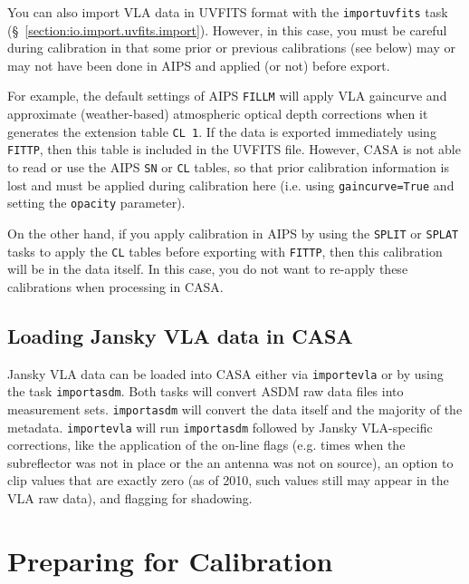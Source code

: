 You can also import VLA data in UVFITS format with the 
{\tt importuvfits} task (\S~\ref{section:io.import.uvfits.import}).
However, in this case, you must be careful during calibration in
that some prior or previous calibrations (see below) may or may not
have been done in AIPS and applied (or not) before export.

For example, the default settings of AIPS {\tt FILLM} will apply
VLA gaincurve and approximate (weather-based) atmospheric optical
depth corrections when it generates the extension table {\tt CL 1}.
If the data is exported immediately using {\tt FITTP}, then this 
table is included in the UVFITS file.  However, CASA is not able
to read or use the AIPS {\tt SN} or {\tt CL} tables, so that 
prior calibration information is lost and must be applied during
calibration here (i.e. using {\tt gaincurve=True} and setting the
{\tt opacity} parameter).  

On the other hand, if you apply calibration in AIPS by using the
{\tt SPLIT} or {\tt SPLAT} tasks to apply the {\tt CL} tables before
exporting with {\tt FITTP}, then this calibration will be in the
data itself.  In this case, you do not want to re-apply these
calibrations when processing in CASA.

\subsection{Loading Jansky VLA data in CASA}
\label{section:cal.flow.evla}

Jansky VLA data can be loaded into CASA either via {\tt importevla} or by
using the task {\tt importasdm}. Both tasks will convert ASDM raw data
files into measurement sets. {\tt importasdm} will convert the data
itself and the majority of the metadata. {\tt importevla} will run
{\tt importasdm} followed by Jansky VLA-specific corrections, like the
application of the on-line flags (e.g. times when the subreflector was
not in place or the an antenna was not on source), an option to clip
values that are exactly zero (as of 2010, such values still may appear
in the VLA raw data), and flagging for shadowing.


\section{Preparing for Calibration}
\label{section:cal.prior}

